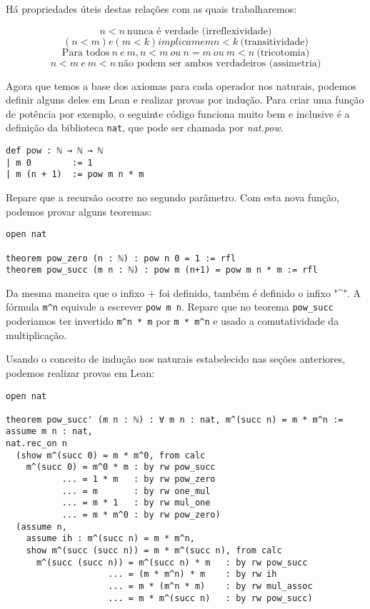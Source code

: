 Há propriedades úteis destas relações com as quais trabalharemos:
\begin{center}
\[n < n \ \textrm{nunca é verdade (irreflexividade)}\]
\[(n<m) e (m<k) implicam em n < k \ \textrm{(transitividade)}\] 
\[\textrm{Para todos} \ n \ e \ m, n < m \ ou \ n = m \ ou \ m < n \ \textrm{(tricotomia)}\]
\[n < m \ e \ m < n  \ \textrm{não podem ser ambos verdadeiros (assimetria)}\] 

Agora que temos a base dos axiomas para cada operador nos naturais, podemos definir alguns deles em Lean e realizar provas por indução. Para criar uma função de potência por exemplo, o seguinte código funciona muito bem e inclusive é a definição da biblioteca \lstinline{nat}, que pode ser chamada por \textit{nat.pow}.

\begin{lstlisting}
def pow : ℕ → ℕ → ℕ
| m 0        := 1
| m (n + 1)  := pow m n * m
\end{lstlisting}

Repare que a recursão ocorre no segundo parâmetro. Com esta nova função, podemos provar alguns teoremas:

\begin{lstlisting}
open nat

theorem pow_zero (n : ℕ) : pow n 0 = 1 := rfl
theorem pow_succ (m n : ℕ) : pow m (n+1) = pow m n * m := rfl
\end{lstlisting}

Da mesma maneira que o infixo $+$ foi definido, também é definido o infixo "\textasciicircum ". A fórmula \lstinline{m^n} equivale a escrever \lstinline{pow m n}. Repare que no teorema \lstinline{pow_succ} poderiamos ter invertido \lstinline{m^n * m} por \lstinline{m * m^n} e usado a comutatividade da multiplicação.

Usando o conceito de indução nos naturais estabelecido nas seções anteriores, podemos realizar provas em Lean:

\begin{lstlisting}
open nat

theorem pow_succ' (m n : ℕ) : ∀ m n : nat, m^(succ n) = m * m^n :=
assume m n : nat,
nat.rec_on n 
  (show m^(succ 0) = m * m^0, from calc
    m^(succ 0) = m^0 * m : by rw pow_succ
           ... = 1 * m   : by rw pow_zero
           ... = m       : by rw one_mul
           ... = m * 1   : by rw mul_one
           ... = m * m^0 : by rw pow_zero)
  (assume n,
    assume ih : m^(succ n) = m * m^n,
    show m^(succ (succ n)) = m * m^(succ n), from calc
      m^(succ (succ n)) = m^(succ n) * m   : by rw pow_succ
                    ... = (m * m^n) * m    : by rw ih
                    ... = m * (m^n * m)    : by rw mul_assoc
                    ... = m * m^(succ n)   : by rw pow_succ)
\end{lstlisting}


\end{center}
